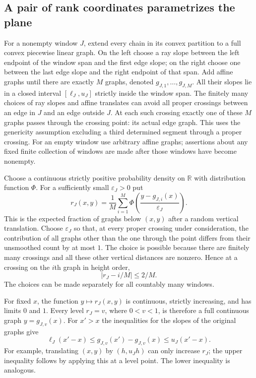 \subsection{A pair of rank coordinates parametrizes the plane}
For a nonempty window $J$, extend every chain in its convex partition to
a full convex piecewise linear graph.  On the left choose a ray slope
between the left endpoint of the window span and the first edge slope;
on the right choose one between the last edge slope and the right
endpoint of that span.  Add affine graphs until there are exactly $M$
graphs, denoted $g_{J,1},\ldots,g_{J,M}$.  All their slopes lie in a
closed interval $[\ell_J,u_J]$ strictly inside the window span.  The
finitely many choices of ray slopes and affine translates can avoid
all proper crossings between an edge in $J$ and an edge outside $J$.
At each such crossing exactly one of these $M$ graphs passes through
the crossing point: its actual edge graph.  This uses the genericity
assumption excluding a third determined segment through a proper
crossing.  For an empty window use arbitrary affine graphs; assertions
about any fixed finite collection of windows are made after those
windows have become nonempty.

Choose a continuous strictly positive probability density on $\mathbb R$
with distribution function $\Phi$.  For a sufficiently small
$\varepsilon_J>0$ put
\[
 r_J(x,y)=\frac1M\sum_{i=1}^M
 \Phi\!\left(\frac{y-g_{J,i}(x)}{\varepsilon_J}\right).
\]
This is the expected fraction of graphs below $(x,y)$ after a random
vertical translation.  Choose $\varepsilon_J$ so that, at every proper
crossing under consideration, the contribution of all graphs other
than the one through the point differs from their unsmoothed count by
at most $1$.  The choice is possible because there are finitely many
crossings and all these other vertical distances are nonzero.  Hence
at a crossing on the $i$th graph in height order,
\begin{equation}\label{eq:rank-slot-error}
 |r_J-i/M|\le 2/M.
\end{equation}
The choices can be made separately for all countably many windows.

For fixed $x$, the function $y\mapsto r_J(x,y)$ is continuous, strictly
increasing, and has limits $0$ and $1$.  Every level $r_J=v$, where
$0<v<1$, is therefore a full continuous graph $y=g_{J,v}(x)$.
For $x'>x$ the inequalities for the slopes of the original graphs give
\[
 \ell_J(x'-x)\le g_{J,v}(x')-g_{J,v}(x)
                    \le u_J(x'-x).
\]
For example, translating $(x,y)$ by $(h,u_Jh)$ can only increase $r_J$;
the upper inequality follows by applying this at a level point.  The
lower inequality is analogous.

